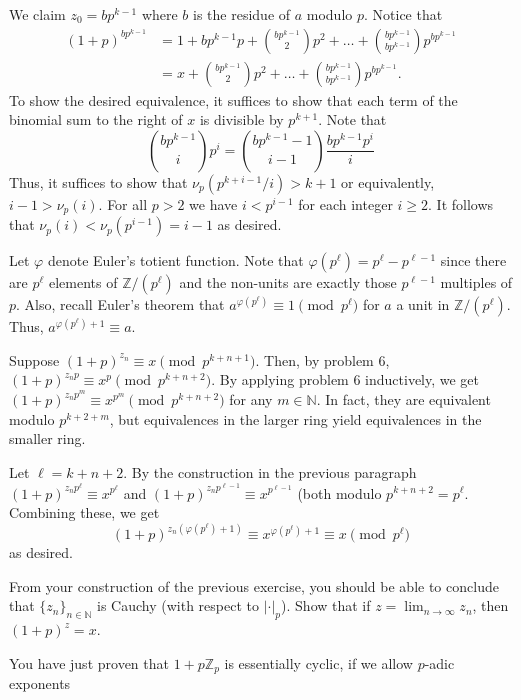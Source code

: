 \documentclass[12 pt, letterpaper]{hmcpset}
\begin{document}
\begin{solution}
	We claim $z_{0} = b p^{k - 1}$ where $b$ is the residue of $a$ modulo $p$. Notice that
	\begin{align*}
		(1 + p)^{b p^{k - 1}} & = 1 + b p^{k - 1} p + \binom{b p^{k - 1}}{2} p^{2} + \dots + \binom{b p^{k - 1}}{b p^{k - 1}} p^{b p^{k - 1}} \\
				      & = x + \binom{b p^{k - 1}}{2} p^{2} + \dots + \binom{b p^{k - 1}}{b p^{k - 1}} p^{b p^{k - 1}}.
	\end{align*}
	To show the desired equivalence, it suffices to show that each term of the binomial sum to the right of $x$ is divisible by $p^{k + 1}$. Note that
	\[
		\binom{b p^{k - 1}}{i} p^{i} = \binom{b p^{k - 1} - 1}{i - 1} \frac{b p^{k - 1} p^{i}}{i}
	\]
	Thus, it suffices to show that $\nu_{p}(p^{k + i - 1} / i) > k + 1$ or equivalently, $i - 1 > \nu_{p}(i)$. For all $p > 2$ we have $i < p^{i - 1}$ for each integer $i \ge 2$. It follows that $\nu_{p}(i) < \nu_{p}(p^{i - 1}) = i - 1$ as desired.

	Let $\varphi$ denote Euler's totient function. Note that $\varphi(p^{\ell}) = p^{\ell} - p^{\ell - 1}$ since there are $p^{\ell}$ elements of $\mathbb{Z} / (p^{\ell})$ and the non-units are exactly those $p^{\ell - 1}$ multiples of $p$. Also, recall Euler's theorem that $a^{\varphi(p^{\ell})} \equiv 1 \pmod{p^{\ell}}$ for $a$ a unit in $\mathbb{Z} / (p^{\ell})$. Thus, $a^{\varphi(p^{\ell}) + 1} \equiv a$.

	Suppose $(1 + p)^{z_{n}} \equiv x \pmod{p^{k + n + 1}}$. Then, by problem 6, $(1 + p)^{z_{n} p} \equiv x^{p} \pmod{p^{k + n + 2}}$. By applying problem 6 inductively, we get $(1 + p)^{z_{n} p^{m}} \equiv x^{p^{m}} \pmod{p^{k + n + 2}}$ for any $m \in \mathbb{N}$. In fact, they are equivalent modulo $p^{k + 2 + m}$, but equivalences in the larger ring yield equivalences in the smaller ring. 

	Let $\ell = k + n + 2$. By the construction in the previous paragraph $(1 + p)^{z_{n} p^{\ell}} \equiv x^{p^{\ell}}$ and $(1 + p)^{z_{n} p^{\ell - 1}} \equiv x^{p^{\ell - 1}}$ (both modulo $p^{k + n + 2} = p^{\ell}$. Combining these, we get
	\[
		(1 + p)^{z_{n} (\varphi(p^{\ell}) + 1)} \equiv x^{\varphi(p^{\ell}) + 1} \equiv x \pmod{p^{\ell}}
	\]
	as desired.
\end{solution}

\pagebreak

\begin{problem}[(9)]
	From your construction of the previous exercise, you should be able to conclude that $\{ z_{n} \}_{n \in \mathbb{N}}$ is Cauchy (with respect to $\lvert \cdot \rvert_{p}$). Show that if $z = \lim_{n \to \infty} z_{n}$, then $(1 + p)^{z} = x$.

	You have just proven that $1 + p \mathbb{Z}_{p}$ is essentially cyclic, if we allow $p$-adic exponents
\end{problem}
\end{document}
